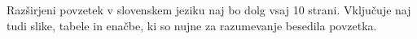 \foreignlanguage{slovene}{  %
Razširjeni povzetek v slovenskem jeziku naj bo dolg vsaj 10 strani. 
Vključuje naj tudi slike, tabele in enačbe, ki so nujne za razumevanje besedila povzetka.
}






